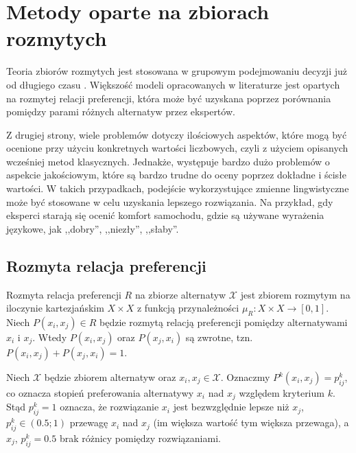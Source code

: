 \section{Metody oparte na zbiorach rozmytych}
Teoria zbiorów rozmytych jest stosowana w grupowym podejmowaniu decyzji już od 
długiego czasu . Większość modeli opracowanych w literaturze jest 
opartych na rozmytej relacji preferencji, która może być uzyskana poprzez 
porównania pomiędzy parami różnych alternatyw przez ekspertów.

Z drugiej strony, wiele problemów dotyczy ilościowych aspektów, które mogą być 
ocenione przy użyciu konkretnych wartości liczbowych, czyli z użyciem opisanych 
wcześniej metod klasycznych. Jednakże, występuje bardzo dużo problemów o 
aspekcie jakościowym, które są bardzo trudne do oceny poprzez dokładne i ścisłe 
wartości. W takich przypadkach, podejście wykorzystujące zmienne lingwistyczne 
może być stosowane w celu uzyskania lepszego rozwiązania. Na przykład, gdy 
eksperci starają się ocenić komfort samochodu, gdzie są używane wyrażenia 
językowe, jak ,,dobry'', ,,niezły'', ,,słaby''.

\subsection{Rozmyta relacja preferencji}

\begin{definition}
Rozmyta relacja preferencji $R$ na zbiorze alternatyw $\mathcal{X}$ jest zbiorem
rozmytym na iloczynie kartezjańskim $X \times X$ z funkcją przynależności
$\mu_R : X \times X \rightarrow [0,1]$. Niech $P(x_i,x_j) \in R$ będzie rozmytą
relacją preferencji pomiędzy alternatywami $x_i$ i $x_j$. Wtedy $P(x_i,x_j)$
oraz $P(x_j,x_i)$ są zwrotne, tzn. $P(x_i,x_j) + P(x_j,x_i) = 1.$
\end{definition}

Niech $\mathcal{X}$ będzie zbiorem alternatyw oraz $x_i,x_j \in \mathcal{X}$.
Oznaczmy $P^k(x_i,x_j) = p^k_{ij}$, co oznacza stopień preferowania alternatywy 
$x_i$ nad $x_j$ względem kryterium $k$. Stąd $p^k_{ij} = 1$ oznacza, że
rozwiązanie $x_i$ jest bezwzględnie lepsze niż $x_j$, $p^k_{ij} \in (0.5; 1)$
przewagę $x_i$ nad $x_j$ (im większa wartość tym większa przewaga), a $x_j$,
$p^k_{ij} = 0.5$ brak różnicy pomiędzy rozwiązaniami.

